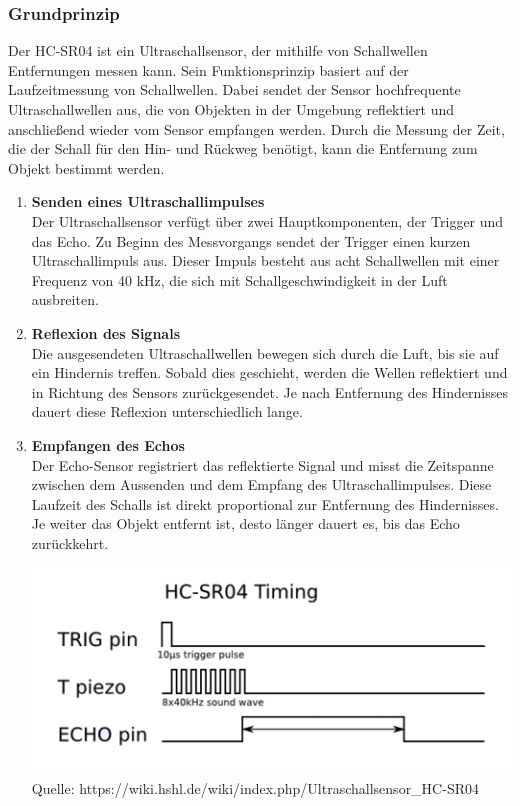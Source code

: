 \documentclass[ngerman,12pt,a4paper]{article}
\begin{document}
		\subsubsection{Grundprinzip}
		Der HC-SR04 ist ein Ultraschallsensor, der mithilfe von Schallwellen Entfernungen messen kann. Sein Funktionsprinzip basiert auf der Laufzeitmessung von Schallwellen. Dabei sendet der Sensor hochfrequente Ultraschallwellen aus, die von Objekten in der Umgebung reflektiert und anschließend wieder vom Sensor empfangen werden. Durch die Messung der Zeit, die der Schall für den Hin- und Rückweg benötigt, kann die Entfernung zum Objekt bestimmt werden. \\[0.3cm]
		\begin{enumerate}
		\item \textbf{Senden eines Ultraschallimpulses} \\
		Der Ultraschallsensor verfügt über zwei Hauptkomponenten, der Trigger und das Echo. 
		Zu Beginn des Messvorgangs sendet der Trigger einen kurzen Ultraschallimpuls aus. 
		Dieser Impuls besteht aus acht Schallwellen mit einer Frequenz von 40 kHz, die sich mit Schallgeschwindigkeit in der Luft ausbreiten.
		
		\item \textbf{Reflexion des Signals} \\
		Die ausgesendeten Ultraschallwellen bewegen sich durch die Luft, bis sie auf ein Hindernis treffen. Sobald dies geschieht, werden die Wellen reflektiert und in Richtung des Sensors zurückgesendet. Je nach Entfernung des Hindernisses dauert diese Reflexion unterschiedlich lange.
		
		\item \textbf{Empfangen des Echos} \\
		Der Echo-Sensor registriert das reflektierte Signal und misst die Zeitspanne zwischen dem Aussenden und dem Empfang des Ultraschallimpulses. Diese Laufzeit des Schalls ist direkt proportional zur Entfernung des Hindernisses. Je weiter das Objekt entfernt ist, desto länger dauert es, bis das Echo zurückkehrt.\\
		
		\begin{center}
			\begin{minipage}{0.7\textwidth}
				\centering
				\includegraphics[width=\textwidth]{Pictures/hcsr04_timing}
				\label{fig:hcsr04_timing}
				\vspace{5pt}
				{\small Quelle: {https://wiki.hshl.de/wiki/index.php/Ultraschallsensor\_HC-SR04}}
			\end{minipage}
		\end{center}
		

\end{enumerate}
\end{document}
